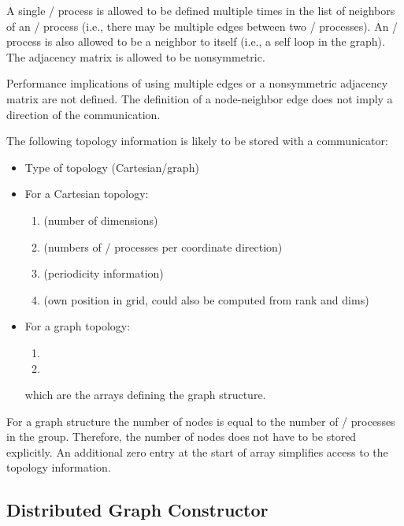 A single \MPI/ process is allowed to be defined multiple times in the list of
neighbors of an \MPI/ process (i.e., there may be multiple edges between two
\MPI/ processes). An \MPI/ process is also allowed to be a neighbor to itself (i.e., a self
loop in the graph). The adjacency matrix is allowed to be nonsymmetric.
\begin{users}
Performance implications of using multiple edges or a nonsymmetric
adjacency matrix are not defined. The definition of a node-neighbor
edge does not imply a direction of the communication.
\end{users} 

\begin{implementors}
The following topology information is likely to be stored with a communicator:
\begin{itemize}
\item Type of topology (Cartesian/graph)
\item For a Cartesian topology:
   \begin{enumerate}
   \item {} (number of dimensions)
   \item {} (numbers of \MPI/ processes per coordinate direction)
   \item {} (periodicity information)
   \item {} (own position in grid, could also be computed
                          from rank and dims)
   \end{enumerate}
\item For a graph topology:
   \begin{enumerate}
   \item {}
   \item {}
   \end{enumerate}
which are the arrays defining the graph structure.
\end{itemize}

For a graph structure the number of nodes is equal to the number of \MPI/ processes
in the group. Therefore, the number of nodes does not have to be stored explicitly.  An
additional zero entry at the start of array  simplifies
access to the topology information.
\end{implementors}

\subsection{Distributed Graph Constructor}
\label{subsec:topol-distgraph-constructor} %

